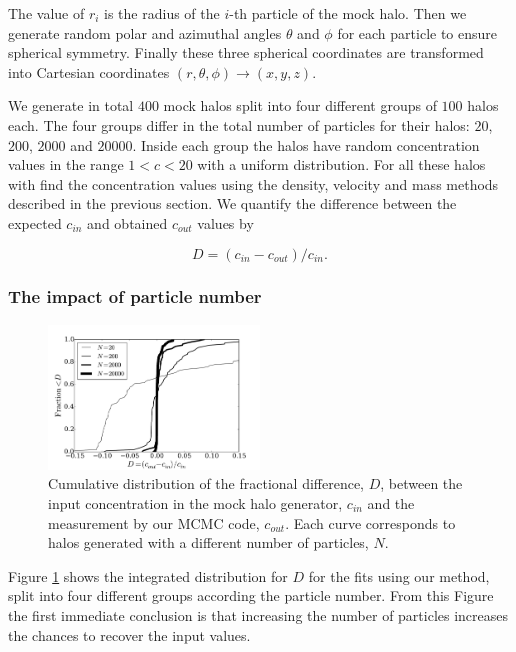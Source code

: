 \documentclass[useAMS,usenatbib]{mn2e}
\begin{document}
The value of $r_i$ is the radius of the $i$-th particle of the mock
halo.
Then we generate random polar and azimuthal angles $\theta$ and $\phi$
for each particle to ensure spherical symmetry.
Finally these three spherical coordinates are transformed into Cartesian coordinates
$(r,\theta,\phi) \rightarrow (x,y,z)$.



We generate in total $400$ mock halos split into four different
groups of $100$ halos each.
The four groups differ in the total number of particles for their halos:
$20$, $200$, $2000$ and $20000$.
Inside each group the halos have random concentration values in
the range $1<c<20$ with a uniform distribution.
For all these halos with find the concentration values using the
density, velocity and mass methods described in the previous
section. We quantify the difference between the expected $c_{in}$
and obtained $c_{out}$ values by

\begin{equation}
D=(c_{in}-c_{out})/c_{in}.
\label{eq:D}
\end{equation}

\subsubsection{The impact of particle number}

\begin{figure}
\begin{center}
  \includegraphics[width=0.50\textwidth]{percentual_diff.pdf}
\end{center}
\caption{Cumulative distribution of the fractional difference, $D$, between
  the input concentration in the mock halo generator, $c_{in}$ and the
  measurement by our MCMC code, $c_{out}$. Each curve corresponds to
  halos generated with a different number of particles, $N$.
    \label{fig:results_mocks}}
\end{figure}

Figure \ref{fig:results_mocks} shows the integrated distribution for
$D$ for the fits using our method, split into four different groups
according the particle number.
From this Figure the first immediate
conclusion is that increasing the number of particles increases the
chances to recover the input values.
\end{document}
